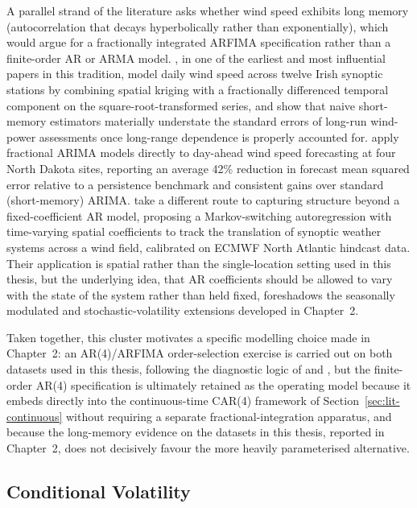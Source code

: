 ﻿\documentclass[11pt, a4paper, twoside]{article}
\begin{document}
A parallel strand of the literature asks whether wind speed exhibits long memory (autocorrelation that decays hyperbolically rather than exponentially), which would argue for a fractionally integrated ARFIMA specification rather than a finite-order AR or ARMA model. \citet{HaslettRaftery1989}, in one of the earliest and most influential papers in this tradition, model daily wind speed across twelve Irish synoptic stations by combining spatial kriging with a fractionally differenced temporal component on the square-root-transformed series, and show that naive short-memory estimators materially understate the standard errors of long-run wind-power assessments once long-range dependence is properly accounted for. \citet{KavasseriSeetharaman2009} apply fractional ARIMA models directly to day-ahead wind speed forecasting at four North Dakota sites, reporting an average 42\% reduction in forecast mean squared error relative to a persistence benchmark and consistent gains over standard (short-memory) ARIMA. \citet{AilliotEtAl2006} take a different route to capturing structure beyond a fixed-coefficient AR model, proposing a Markov-switching autoregression with time-varying spatial coefficients to track the translation of synoptic weather systems across a wind field, calibrated on ECMWF North Atlantic hindcast data. Their application is spatial rather than the single-location setting used in this thesis, but the underlying idea, that AR coefficients should be allowed to vary with the state of the system rather than held fixed, foreshadows the seasonally modulated and stochastic-volatility extensions developed in Chapter~2.

Taken together, this cluster motivates a specific modelling choice made in Chapter~2: an AR(4)/ARFIMA order-selection exercise is carried out on both datasets used in this thesis, following the diagnostic logic of \citet{HaslettRaftery1989} and \citet{KavasseriSeetharaman2009}, but the finite-order AR(4) specification is ultimately retained as the operating model because it embeds directly into the continuous-time CAR(4) framework of Section~\ref{sec:lit-continuous} without requiring a separate fractional-integration apparatus, and because the long-memory evidence on the datasets in this thesis, reported in Chapter~2, does not decisively favour the more heavily parameterised alternative.

\subsection{Conditional Volatility}
\label{sec:lit-volatility}
\end{document}
